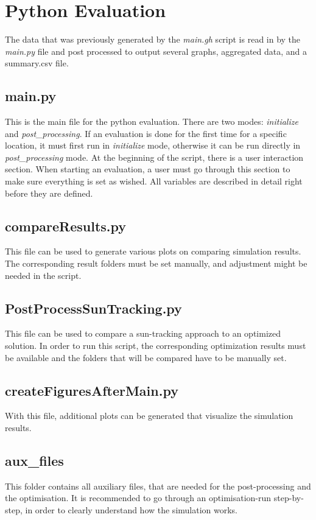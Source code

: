 \section{Python Evaluation}

	The data that was previously generated by the \emph{main.gh} script is read in by the \emph{main.py} file and post processed to output several graphs, aggregated data, and a summary.csv file. 

	\subsection{main.py}
	This is the main file for the python evaluation. There are two modes: \emph{initialize} and \emph{post\_processing}. If an evaluation is done for the first time for a specific location, it must first run in \emph{initialize} mode, otherwise it can be run directly in \emph{post\_processing} mode. 
	At the beginning of the script, there is a user interaction section. When starting an evaluation, a user must go through this section to make sure everything is set as wished. All variables are described in detail right before they are defined. 

	\subsection{compareResults.py}
	This file can be used to generate various plots on comparing simulation results. The corresponding result folders must be set manually, and adjustment might be needed in the script. 
	
	\subsection{PostProcessSunTracking.py}
	This file can be used to compare a sun-tracking approach to an optimized solution. In order to run this script, the corresponding optimization results must be available and the folders that will be compared have to be manually set.

	\subsection{createFiguresAfterMain.py}
	With this file, additional plots can be generated that visualize the simulation results. 

	\subsection{aux\_files}
	This folder contains all auxiliary files, that are needed for the post-processing and the optimisation. It is recommended to go through an optimisation-run step-by-step, in order to clearly understand how the simulation works. 

